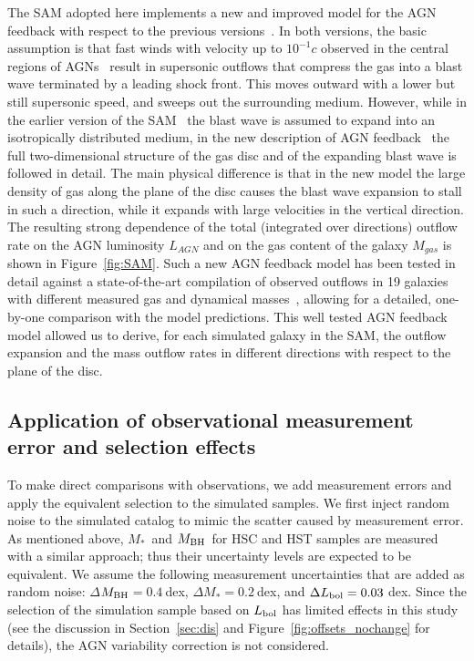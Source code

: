 \documentclass[twocolumn]{aastex631}
\def\smass{{$M_*$}}
\def\mbh{$M_{\rm BH}$}
\begin{document}
The SAM adopted here implements a new and improved  model for the AGN feedback with respect to the previous versions~\citep{Menci2008}. In both versions, the basic assumption is that fast winds with velocity up to $10^{-1}c$ observed in the central regions of AGNs~\citep{Chartas2002, Pounds2003}  result in  supersonic outflows that compress the gas into a blast wave terminated by a leading shock front. This  moves outward with a lower but still supersonic speed, and sweeps out the surrounding medium. However, while in the earlier version of the SAM~\citep{Menci2016} the blast wave is assumed to expand into an isotropically distributed medium, in the new description of AGN feedback~\citep{Menci2019} the full two-dimensional structure of the gas disc and of the expanding blast wave is followed in detail. The main physical difference is that in the new model the large density of gas along the plane of the disc causes the blast wave expansion to stall in such a direction, while it expands with large velocities in the vertical direction. The resulting strong dependence of the total (integrated over directions) outflow rate on the AGN luminosity $L_{AGN}$ and on the gas content of the galaxy $M_{gas}$ is shown in Figure~\ref{fig:SAM}. Such a new AGN feedback model has been tested in detail against a state-of-the-art compilation of observed outflows in 19 galaxies with different measured gas and dynamical masses~\citep{Fiore2017}, allowing for a detailed, one-by-one comparison with the model predictions. This well tested AGN feedback model allowed us to derive, for each simulated galaxy in the SAM,  the outflow expansion and the mass outflow rates in different directions with respect to the plane of the disc.



\subsection{Application of observational measurement error and selection effects}\label{subsec:add_obs_eff}
To make direct comparisons with observations, we add measurement errors and apply the equivalent selection to the simulated samples. We first inject random noise to the simulated catalog to mimic the scatter caused by measurement error. As mentioned above, \smass\ and \mbh\ for HSC and HST samples are measured with a similar approach; thus their uncertainty levels are expected to be equivalent. We assume the following measurement uncertainties that are added as random noise: $\Delta$\mbh$ = 0.4~$dex, $\Delta$\smass$ = 0.2~$dex, and $\Delta L_{\rm bol} = 0.03~$dex. Since the selection of the simulation sample based on $L_{\rm bol}$ has limited effects in this study (see the discussion in Section~\ref{sec:dis} and Figure~\ref{fig:offsets_nochange} for details), the AGN variability correction is not considered.
\end{document}

